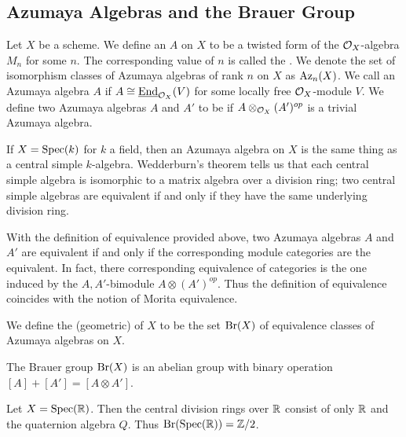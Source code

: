 \subsection{Azumaya Algebras and the Brauer Group}
\begin{defn}
Let $X$ be a scheme.  We define an  $A$ on $X$ to be a twisted form of the $\mathcal{O}_X$-algebra $M_n$ for some $n$.  The corresponding value of $n$ is called the .  We denote the set of isomorphism classes of Azumaya algebras of rank $n$ on $X$ as $\textnormal{Az}_n(X)$.  We call an Azumaya algebra $A$  if $A \cong \underline{\textnormal{End}}_{\mathcal{O}_X}(V)$ for some locally free $\mathcal{O}_X$-module $V$.  We define two Azumaya algebras $A$ and $A'$ to be  if $A\otimes_{\mathcal{O}_X}(A')^{op}$ is a trivial Azumaya algebra.
\end{defn}

\begin{ex}
If $X = \textnormal{Spec}(k)$ for $k$ a field, then an Azumaya algebra on $X$ is the same thing as a central simple $k$-algebra.  Wedderburn's theorem tells us that each central simple algebra is isomorphic to a matrix algebra over a division ring; two central simple algebras are equivalent if and only if they have the same underlying division ring.
\end{ex}

\begin{remk}
With the definition of equivalence provided above, two Azumaya algebras $A$ and $A'$ are equivalent if and only if the corresponding module categories are the equivalent.  In fact, there corresponding equivalence of categories is the one induced by the $A,A'$-bimodule $A\otimes(A')^{op}$.  Thus the definition of equivalence coincides with the notion of Morita equivalence.
\end{remk}

\begin{defn}
We define the (geometric)  of $X$ to be the set $\textnormal{Br}(X)$ of equivalence classes of Azumaya algebras on $X$.
\end{defn}

\begin{prop}
The Brauer group $\textnormal{Br}(X)$ is an abelian group with binary operation $[A]+[A'] = [A\otimes A']$.
\end{prop}

\begin{ex}
Let $X = \textnormal{Spec}(\mathbb{R})$.  Then the central division rings over $\mathbb{R}$ consist of only $\mathbb{R}$ and the quaternion algebra $Q$.  Thus $\textnormal{Br}(\textnormal{Spec}(\mathbb{R})) = \mathbb{Z}/2$.
\end{ex}

